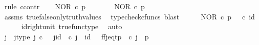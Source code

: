 \begin{isabellebody}
%
\isadelimproof
%
\endisadelimproof
%
\isatagproof
{}\isamarkupfalse%
\ {\isacharparenleft}{\kern0pt}rule\ ccontr{\isacharparenright}{\kern0pt}\isanewline
\ \ \isamarkupfalse%
\ {\isachardoublequoteopen}NOR\ {\isasymcirc}\isactrlsub c\ {\isasymlangle}p{\isacharcomma}{\kern0pt}{\isasymt}{\isasymrangle}\ {\isasymnoteq}\ {\isasymf}{\isachardoublequoteclose}\isanewline
\ \ \isamarkupfalse%
\ \isamarkupfalse%
\ {\isachardoublequoteopen}NOR\ {\isasymcirc}\isactrlsub c\ {\isasymlangle}p{\isacharcomma}{\kern0pt}{\isasymt}{\isasymrangle}\ {\isacharequal}{\kern0pt}\ {\isasymt}{\isachardoublequoteclose}\isanewline
\ \ \ \ \isamarkupfalse%
\ assms\ true{\isacharunderscore}{\kern0pt}false{\isacharunderscore}{\kern0pt}only{\isacharunderscore}{\kern0pt}truth{\isacharunderscore}{\kern0pt}values\ \isamarkupfalse%
\ {\isacharparenleft}{\kern0pt}typecheck{\isacharunderscore}{\kern0pt}cfuncs{\isacharcomma}{\kern0pt}\ blast{\isacharparenright}{\kern0pt}\isanewline
\ \ \isamarkupfalse%
\ \isamarkupfalse%
\ {\isachardoublequoteopen}NOR\ {\isasymcirc}\isactrlsub c\ {\isasymlangle}p{\isacharcomma}{\kern0pt}{\isasymt}{\isasymrangle}\ {\isacharequal}{\kern0pt}\ {\isasymt}\ {\isasymcirc}\isactrlsub c\ id\ {\isasymone}{\isachardoublequoteclose}\isanewline
\ \ \ \ \isamarkupfalse%
\ id{\isacharunderscore}{\kern0pt}right{\isacharunderscore}{\kern0pt}unit{}\ true{\isacharunderscore}{\kern0pt}func{\isacharunderscore}{\kern0pt}type\ \isamarkupfalse%
\ auto\isanewline
\ \ \isamarkupfalse%
\ \isamarkupfalse%
\ j\ \ j{\isacharunderscore}{\kern0pt}type{\isacharcolon}{\kern0pt}\ {\isachardoublequoteopen}j\ {\isasymin}\isactrlsub c\ {\isasymone}{\isachardoublequoteclose}\ \ j{\isacharunderscore}{\kern0pt}id{\isacharcolon}{\kern0pt}\ {\isachardoublequoteopen}{\isasymbeta}\isactrlbsub {\isasymone}\isactrlesub \ {\isasymcirc}\isactrlsub c\ j\ {\isacharequal}{\kern0pt}\ id\ {\isasymone}{\isachardoublequoteclose}\ \ ff{\isacharunderscore}{\kern0pt}j{\isacharunderscore}{\kern0pt}eq{\isacharunderscore}{\kern0pt}tp{\isacharcolon}{\kern0pt}\ {\isachardoublequoteopen}{\isasymlangle}{\isasymf}{\isacharcomma}{\kern0pt}{\isasymf}{\isasymrangle}\ {\isasymcirc}\isactrlsub c\ j\ {\isacharequal}{\kern0pt}\ {\isasymlangle}p{\isacharcomma}{\kern0pt}{\isasymt}{\isasymrangle}{\isachardoublequoteclose}\isanewline
\ \ \ \ \isamarkupfalse%

\end{isabellebody}
